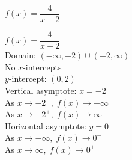 {$f(x) = \dfrac{4}{x + 2}$}
{$f(x) = \dfrac{4}{x + 2}$\\
Domain: $(-\infty, -2) \cup (-2, \infty)$\\
No $x$-intercepts\\
$y$-intercept: $(0, 2)$\\
Vertical asymptote: $x = -2$\\
As $x \rightarrow -2^{-}, \; f(x) \rightarrow -\infty$\\
As $x \rightarrow -2^{+}, \; f(x) \rightarrow \infty$\\
Horizontal asymptote: $y = 0$\\
As $x \rightarrow -\infty, \; f(x) \rightarrow 0^{-}$\\
As $x \rightarrow \infty, \; f(x) \rightarrow 0^{+}$

\begin{center}
\end{center}}
